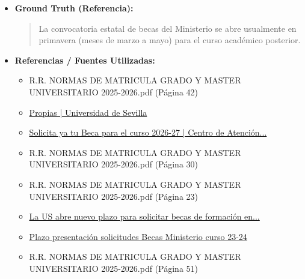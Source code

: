 \documentclass[12pt,a4paper,oneside]{report}
\begin{document}
\begin{itemize}
\begin{itemize}
\begin{quote}
Para más detalles sobre los plazos y requisitos, te recomiendo consultar las fuentes proporcionadas y la página web oficial de la Universidad de Sevilla.
                \end{quote}
          \item \textbf{{Ground Truth (Referencia):}} \\
                \begin{quote}
La convocatoria estatal de becas del Ministerio se abre usualmente en primavera (meses de marzo a mayo) para el curso académico posterior.
                \end{quote}
          \item \textbf{{Referencias / Fuentes Utilizadas:}} \\
                \begin{itemize}
                  \item R.R. NORMAS DE MATRICULA GRADO Y MASTER UNIVERSITARIO 2025-2026.pdf (Página 42)
                  \item \href{https://www.us.es/estudiar/becas-ayudas/becas-y-ayudas-de-formacion/propias}{Propias | Universidad de Sevilla}
                  \item \href{https://cat.us.es/noticias/solicita-ya-tu-beca-para-el-curso-2026-27}{Solicita ya tu Beca para el curso 2026-27 | Centro de Atención...}
                  \item R.R. NORMAS DE MATRICULA GRADO Y MASTER UNIVERSITARIO 2025-2026.pdf (Página 30)
                  \item R.R. NORMAS DE MATRICULA GRADO Y MASTER UNIVERSITARIO 2025-2026.pdf (Página 23)
                  \item \href{https://www.us.es/actualidad-de-la-us/la-us-abre-nuevo-plazo-para-solicitar-becas-de-formacion-en-dinamizacion-de}{La US abre nuevo plazo para solicitar becas de formación en...}
                  \item \href{https://cat.us.es/seccion/durante-los-estudios/becas-ayudas-y-premios/becas-mefp-ministerio/noticias/plazo-presentacion-solicitudes-becas-ministerio-curso-23-24}{Plazo presentación solicitudes Becas Ministerio curso 23-24}
                  \item R.R. NORMAS DE MATRICULA GRADO Y MASTER UNIVERSITARIO 2025-2026.pdf (Página 51)
                \end{itemize}
        \end{itemize}


\end{itemize}
\end{document}
